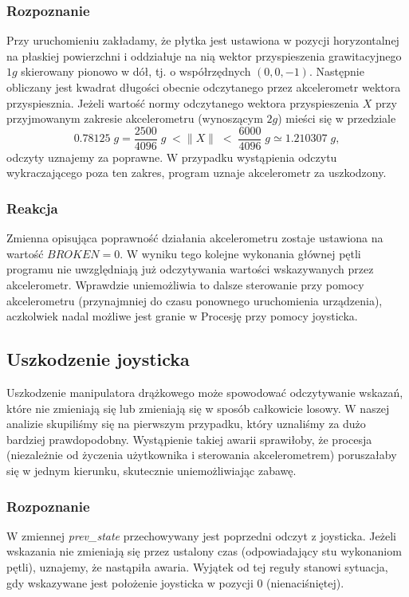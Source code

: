 \documentclass[a4paper,12pt,twoside]{article}
\theoremstyle{plain}
\theoremstyle{definition}
\theoremstyle{remark}
\begin{document}
	\subsubsection{Rozpoznanie}
	Przy uruchomieniu zakładamy, że płytka jest ustawiona w pozycji horyzontalnej na płaskiej powierzchni i oddziałuje na nią wektor przyspieszenia grawitacyjnego $1g$ skierowany pionowo w dół, tj. o współrzędnych $(0,0,-1)$. Następnie obliczany jest kwadrat długości obecnie odczytanego przez akcelerometr wektora przyspiesznia. Jeżeli wartość normy odczytanego wektora przyspieszenia $X$ przy przyjmowanym zakresie akcelerometru (wynoszącym $2g$) mieści się w przedziale
	$$0.78125\;g = \frac{2500}{4096}\; g \; < \| X \| \; < \; \frac{6000}{4096}\; g \simeq 1.210307\; g ,$$
	odczyty uznajemy za poprawne. W przypadku wystąpienia odczytu wykraczającego poza ten zakres, program uznaje akcelerometr za uszkodzony.
	\subsubsection{Reakcja}
	Zmienna opisująca poprawność działania akcelerometru zostaje ustawiona na wartość $BROKEN = 0$. W wyniku tego kolejne wykonania głównej pętli programu nie uwzględniają już odczytywania wartości wskazywanych przez akcelerometr. Wprawdzie uniemożliwia to dalsze sterowanie przy pomocy akcelerometru (przynajmniej do czasu ponownego uruchomienia urządzenia), aczkolwiek nadal możliwe jest granie w Procesję przy pomocy joysticka.
	\subsection{Uszkodzenie joysticka}
	Uszkodzenie manipulatora drążkowego może spowodować odczytywanie wskazań, które nie zmieniają się lub zmieniają się w sposób całkowicie losowy. W naszej analizie skupiliśmy się na pierwszym przypadku, który uznaliśmy za dużo bardziej prawdopodobny. Wystąpienie takiej awarii sprawiłoby, że procesja (niezależnie od życzenia użytkownika i sterowania akcelerometrem) poruszałaby się w jednym kierunku, skutecznie uniemożliwiając zabawę.
	\subsubsection{Rozpoznanie}
	W zmiennej \textit{prev\_state} przechowywany jest poprzedni odczyt z joysticka. 
	Jeżeli wskazania nie zmieniają się przez ustalony czas (odpowiadający stu wykonaniom pętli), uznajemy, że nastąpiła awaria. Wyjątek od tej reguły stanowi sytuacja, gdy wskazywane jest położenie joysticka w pozycji $0$ (nienaciśniętej). 
\end{document}
